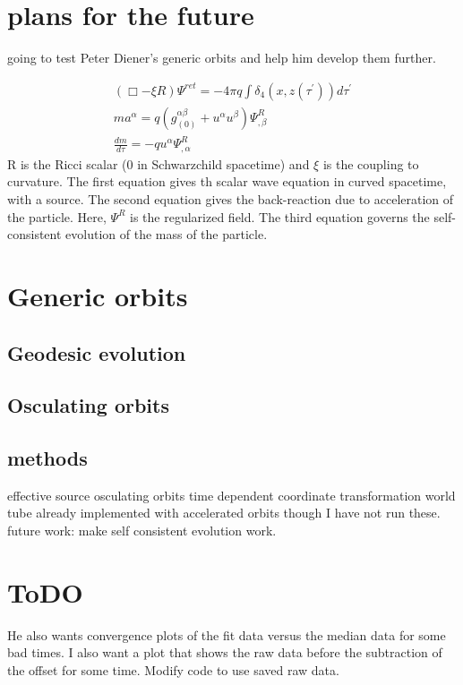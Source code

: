 \section{plans for the future}
going to test Peter Diener's generic orbits and help him develop them further.

\begin{eqnarray}
  (\Box - \xi R)\Psi^{ret} = -4\pi q \int\delta_4(x,z(\tau^\prime))d\tau^\prime\\
    ma^\alpha=q(g^{\alpha\beta}_{(0)}+u^\alpha u^\beta)\Psi^{R}_{,\beta}\\
    \frac{dm}{d\tau}=-q u^\alpha\Psi^R_{,\alpha}
\end{eqnarray}
R is the Ricci scalar (0 in Schwarzchild spacetime) and $\xi$ is the coupling to curvature. The first equation gives th scalar wave equation in curved spacetime, with a source. The second equation gives the back-reaction due to acceleration of the particle. Here, $\Psi^R$ is the regularized field. The third equation governs the self-consistent evolution of the mass of the particle.~\cite{WardellSelfForceReview}

\section{Generic orbits}
\subsection{Geodesic evolution}
\subsection{Osculating orbits}



\subsection{methods}
effective source
osculating orbits
time dependent coordinate transformation
world tube
already implemented with accelerated orbits though I have not run these.
future work: make self consistent evolution work. 



\section{ToDO}
He also wants convergence plots of the fit data versus the median data for some bad times. I also want a plot that shows the raw data before the subtraction of the offset for some time. Modify code to use saved raw data.


